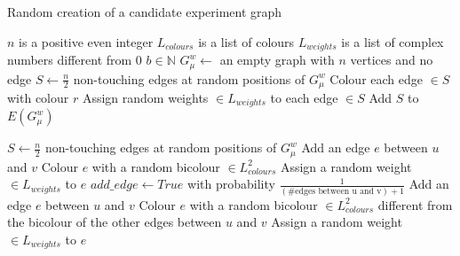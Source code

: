 \begin{enumerate}
\begin{definition}
            \begin{algorithm}
                \caption{Random creation of a candidate experiment graph}
                \label{alg:random_creation_candidate_experiment_graph}
                \begin{algorithmic}
                    \Require $n$ is a positive even integer
                    \Require $L_{colours}$ is a list of colours
                    \Require $L_{weights}$ is a list of complex numbers different from 0
                    \Require $b \in \mathbb{N}$
                    \State $G_\mu^w \gets$ an empty graph with $n$ vertices and no edge
                        \State $S \gets \frac{n}{2}$ non-touching edges at random positions of $G_\mu^w$
                        \State Colour each edge $\in S$ with colour $r$
                        \State Assign random weights $\in L_{weights}$ to each edge $\in S$
                        \State Add $S$ to $E(G_\mu^w)$
                    \EndFor

                        \State $S \gets \frac{n}{2}$ non-touching edges at random positions of $G_\mu^w$
                                \State Add an edge $e$ between $u$ and $v$
                                \State Colour $e$ with a random bicolour $\in L_{colours}^2$
                                \State Assign a random weight $\in L_{weights}$ to $e$
                            \Else
                                \State $add\_edge \gets True$ with probability $\frac{1}{(\mbox{\#edges between u and v}) + 1}$
                                    \State Add an edge $e$ between $u$ and $v$
                                    \State Colour $e$ with a random bicolour $\in L_{colours}^2$ different from the bicolour of the other edges between $u$ and $v$
                                    \State Assign a random weight $\in L_{weights}$ to $e$
                                \EndIf
                            \EndIf
                        \EndFor
                    \EndFor
                \end{algorithmic}
            \end{algorithm}
        \end{definition}


\end{enumerate}
